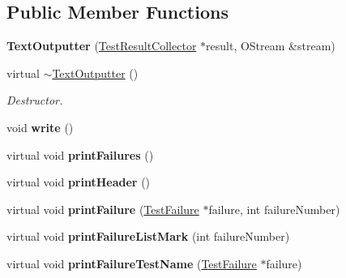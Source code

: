 \subsection*{Public Member Functions}
\begin{DoxyCompactItemize}
\item 
{\bfseries Text\+Outputter} (\hyperlink{class_test_result_collector}{Test\+Result\+Collector} $\ast$result, O\+Stream \&stream)\hypertarget{class_text_outputter_aa513788ccc271901964847902fe3fe8e}{}\label{class_text_outputter_aa513788ccc271901964847902fe3fe8e}

\item 
virtual \hyperlink{class_text_outputter_a4198a0eaa07f3ff43fcbcab74d080b6b}{$\sim$\+Text\+Outputter} ()\hypertarget{class_text_outputter_a4198a0eaa07f3ff43fcbcab74d080b6b}{}\label{class_text_outputter_a4198a0eaa07f3ff43fcbcab74d080b6b}

\begin{DoxyCompactList}\small\item\em Destructor. \end{DoxyCompactList}\item 
void {\bfseries write} ()\hypertarget{class_text_outputter_a6b52425e9d17a04f04fc42a88b564176}{}\label{class_text_outputter_a6b52425e9d17a04f04fc42a88b564176}

\item 
virtual void {\bfseries print\+Failures} ()\hypertarget{class_text_outputter_a4c1413e4ce39317c18e3eed577dd208b}{}\label{class_text_outputter_a4c1413e4ce39317c18e3eed577dd208b}

\item 
virtual void {\bfseries print\+Header} ()\hypertarget{class_text_outputter_a3d80efeb41c0401372536b362358dc45}{}\label{class_text_outputter_a3d80efeb41c0401372536b362358dc45}

\item 
virtual void {\bfseries print\+Failure} (\hyperlink{class_test_failure}{Test\+Failure} $\ast$failure, int failure\+Number)\hypertarget{class_text_outputter_af2f2271d5795c6be4f7a47e255554a69}{}\label{class_text_outputter_af2f2271d5795c6be4f7a47e255554a69}

\item 
virtual void {\bfseries print\+Failure\+List\+Mark} (int failure\+Number)\hypertarget{class_text_outputter_a029d1e203df4e3f426eb9685062683bc}{}\label{class_text_outputter_a029d1e203df4e3f426eb9685062683bc}

\item 
virtual void {\bfseries print\+Failure\+Test\+Name} (\hyperlink{class_test_failure}{Test\+Failure} $\ast$failure)\hypertarget{class_text_outputter_a200849dff27b10844d117029576b17ac}{}\label{class_text_outputter_a200849dff27b10844d117029576b17ac}


\end{DoxyCompactItemize}
